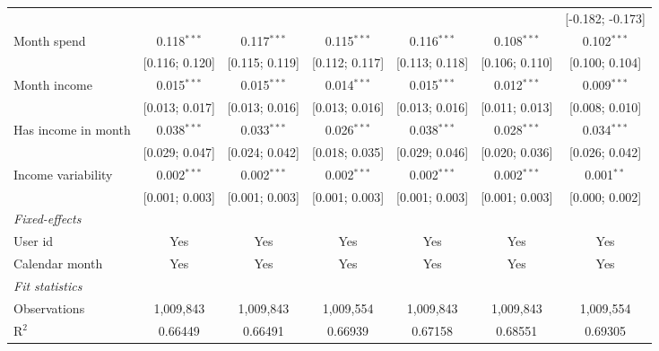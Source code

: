 \begin{table}[htbp]
\begin{threeparttable}[b]
\begin{tabular}{lcccccc}
                                        &                  &                &                &                  &                  & [-0.182; -0.173]\\   
         Month spend                    & 0.118$^{***}$    & 0.117$^{***}$  & 0.115$^{***}$  & 0.116$^{***}$    & 0.108$^{***}$    & 0.102$^{***}$\\   
                                        & [0.116; 0.120]   & [0.115; 0.119] & [0.112; 0.117] & [0.113; 0.118]   & [0.106; 0.110]   & [0.100; 0.104]\\   
         Month income                   & 0.015$^{***}$    & 0.015$^{***}$  & 0.014$^{***}$  & 0.015$^{***}$    & 0.012$^{***}$    & 0.009$^{***}$\\   
                                        & [0.013; 0.017]   & [0.013; 0.016] & [0.013; 0.016] & [0.013; 0.016]   & [0.011; 0.013]   & [0.008; 0.010]\\   
         Has income in month            & 0.038$^{***}$    & 0.033$^{***}$  & 0.026$^{***}$  & 0.038$^{***}$    & 0.028$^{***}$    & 0.034$^{***}$\\   
                                        & [0.029; 0.047]   & [0.024; 0.042] & [0.018; 0.035] & [0.029; 0.046]   & [0.020; 0.036]   & [0.026; 0.042]\\   
         Income variability             & 0.002$^{***}$    & 0.002$^{***}$  & 0.002$^{***}$  & 0.002$^{***}$    & 0.002$^{***}$    & 0.001$^{**}$\\   
                                        & [0.001; 0.003]   & [0.001; 0.003] & [0.001; 0.003] & [0.001; 0.003]   & [0.001; 0.003]   & [0.000; 0.002]\\   
         \midrule
         \emph{Fixed-effects}\\
         User id                        & Yes              & Yes            & Yes            & Yes              & Yes              & Yes\\  
         Calendar month                 & Yes              & Yes            & Yes            & Yes              & Yes              & Yes\\  
         \midrule
         \emph{Fit statistics}\\
         Observations                   & 1,009,843        & 1,009,843      & 1,009,554      & 1,009,843        & 1,009,843        & 1,009,554\\  
         R$^2$                          & 0.66449          & 0.66491        & 0.66939        & 0.67158          & 0.68551          & 0.69305\\  

\end{tabular}
\end{threeparttable}
\end{table}
